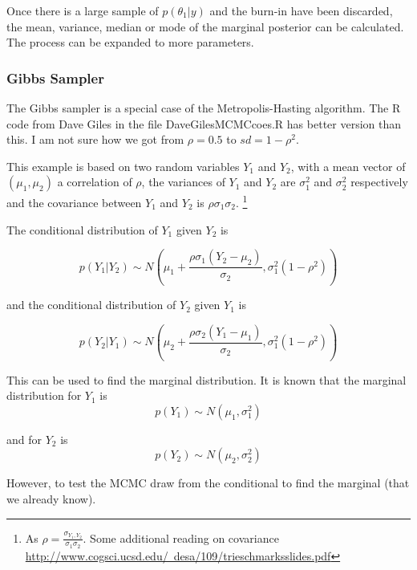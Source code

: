 \documentclass[12pt, a4paper, oneside]{article}\usepackage[]{graphicx}\usepackage[]{color}
\begin{document}
Once there is a large sample of $p(\theta_1|y)$ and the burn-in have been discarded, the mean, variance, median or mode of the marginal posterior can be calculated.  The process can be expanded to more parameters. 

\subsubsection{Gibbs Sampler}
The Gibbs sampler is a special case of the Metropolis-Hasting algorithm. 
The R code from Dave Giles in the file DaveGilesMCMCcoes.R has better version than this. I am not sure how we got from $\rho = 0.5$ to $sd = 1-\rho^2$. 

This example is based on two random variables $Y_1$ and $Y_2$, with a mean vector of $(\mu_1, \mu_2)$ a correlation of $\rho$, the variances of $Y_1$ and $Y_2$ are $\sigma_1^2$ and $\sigma_2^2$ respectively and the covariance between $Y_1$ and $Y_2$ is $\rho \sigma_1 \sigma_2$. \footnote{As $\rho = \frac{\sigma_{Y_1, Y_2}}{\sigma_1 \sigma_2}$.  Some additional reading on covariance \href{http://www.cogsci.ucsd.edu/~desa/109/trieschmarksslides.pdf}{http://www.cogsci.ucsd.edu/~desa/109/trieschmarksslides.pdf}}



The conditional distribution of $Y_1$ given $Y_2$ is 

\begin{equation}
p(Y_1| Y_2) \sim N \left(\mu_1 + \frac{\rho\sigma_1(Y_2 - \mu_2)}{\sigma_2}, \sigma_1^2(1 - \rho^2)\right)
\end{equation}

and the conditional distribution of $Y_2$ given $Y_1$ is

\begin{equation}
p(Y_2| Y_1) \sim N \left(\mu_2 + \frac{\rho\sigma_2(Y_1 - \mu_1)}{\sigma_2}, \sigma_1^2(1 - \rho^2) \right)
\end{equation}

This can be used to find the marginal distribution. It is known that the marginal distribution for $Y_1$ is
\begin{equation}
p(Y_1) \sim N(\mu_1, \sigma_1^2)
\end{equation}

and for $Y_2$ is 
\begin{equation}
p(Y_2) \sim N(\mu_2, \sigma_2^2)
\end{equation}

However, to test the MCMC draw from the conditional to find the marginal (that we already know).  
\end{document}
